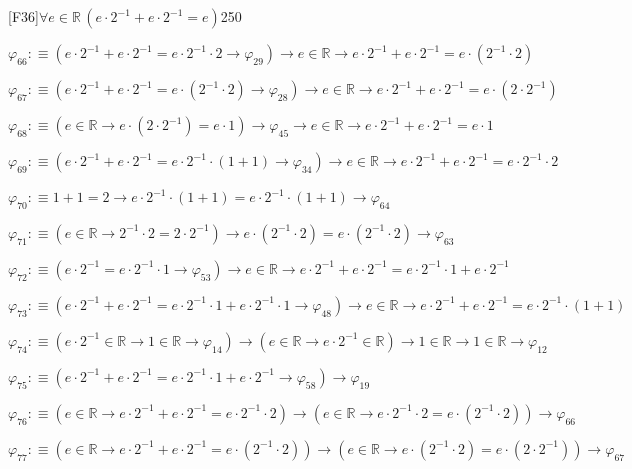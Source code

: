 \begin{fullproof}{[F36]}{$\forall e \in \mathbb{R}\,(e \cdot 2^{-1} + e \cdot 2^{-1} = e)$}{250}
\begin{abbrevlist}
\item $\varphi_{66} :\equiv (e \cdot 2^{-1} + e \cdot 2^{-1} = e \cdot 2^{-1} \cdot 2 \to \varphi_{29}) \to e \in \mathbb{R} \to e \cdot 2^{-1} + e \cdot 2^{-1} = e \cdot (2^{-1} \cdot 2)$
\item $\varphi_{67} :\equiv (e \cdot 2^{-1} + e \cdot 2^{-1} = e \cdot (2^{-1} \cdot 2) \to \varphi_{28}) \to e \in \mathbb{R} \to e \cdot 2^{-1} + e \cdot 2^{-1} = e \cdot (2 \cdot 2^{-1})$
\item $\varphi_{68} :\equiv (e \in \mathbb{R} \to e \cdot (2 \cdot 2^{-1}) = e \cdot 1) \to \varphi_{45} \to e \in \mathbb{R} \to e \cdot 2^{-1} + e \cdot 2^{-1} = e \cdot 1$
\item $\varphi_{69} :\equiv (e \cdot 2^{-1} + e \cdot 2^{-1} = e \cdot 2^{-1} \cdot (1 + 1) \to \varphi_{34}) \to e \in \mathbb{R} \to e \cdot 2^{-1} + e \cdot 2^{-1} = e \cdot 2^{-1} \cdot 2$
\item $\varphi_{70} :\equiv 1 + 1 = 2 \to e \cdot 2^{-1} \cdot (1 + 1) = e \cdot 2^{-1} \cdot (1 + 1) \to \varphi_{64}$
\item $\varphi_{71} :\equiv (e \in \mathbb{R} \to 2^{-1} \cdot 2 = 2 \cdot 2^{-1}) \to e \cdot (2^{-1} \cdot 2) = e \cdot (2^{-1} \cdot 2) \to \varphi_{63}$
\item $\varphi_{72} :\equiv (e \cdot 2^{-1} = e \cdot 2^{-1} \cdot 1 \to \varphi_{53}) \to e \in \mathbb{R} \to e \cdot 2^{-1} + e \cdot 2^{-1} = e \cdot 2^{-1} \cdot 1 + e \cdot 2^{-1}$
\item $\varphi_{73} :\equiv (e \cdot 2^{-1} + e \cdot 2^{-1} = e \cdot 2^{-1} \cdot 1 + e \cdot 2^{-1} \cdot 1 \to \varphi_{48}) \to e \in \mathbb{R} \to e \cdot 2^{-1} + e \cdot 2^{-1} = e \cdot 2^{-1} \cdot (1 + 1)$
\item $\varphi_{74} :\equiv (e \cdot 2^{-1} \in \mathbb{R} \to 1 \in \mathbb{R} \to \varphi_{14}) \to (e \in \mathbb{R} \to e \cdot 2^{-1} \in \mathbb{R}) \to 1 \in \mathbb{R} \to 1 \in \mathbb{R} \to \varphi_{12}$
\item $\varphi_{75} :\equiv (e \cdot 2^{-1} + e \cdot 2^{-1} = e \cdot 2^{-1} \cdot 1 + e \cdot 2^{-1} \to \varphi_{58}) \to \varphi_{19}$
\item $\varphi_{76} :\equiv (e \in \mathbb{R} \to e \cdot 2^{-1} + e \cdot 2^{-1} = e \cdot 2^{-1} \cdot 2) \to (e \in \mathbb{R} \to e \cdot 2^{-1} \cdot 2 = e \cdot (2^{-1} \cdot 2)) \to \varphi_{66}$
\item $\varphi_{77} :\equiv (e \in \mathbb{R} \to e \cdot 2^{-1} + e \cdot 2^{-1} = e \cdot (2^{-1} \cdot 2)) \to (e \in \mathbb{R} \to e \cdot (2^{-1} \cdot 2) = e \cdot (2 \cdot 2^{-1})) \to \varphi_{67}$

\end{abbrevlist}
\end{fullproof}
